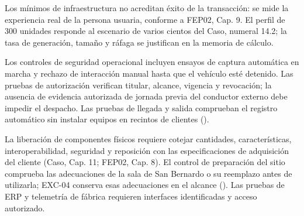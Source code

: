 Los mínimos de infraestructura no acreditan éxito de la transacción: se mide la experiencia real de la persona usuaria, conforme a FEP02, Cap. 9. El perfil de 300 unidades responde al escenario de varios cientos del Caso, numeral 14.2; la tasa de generación, tamaño y ráfaga se justifican en la memoria de cálculo.

Los controles de seguridad operacional incluyen ensayos de captura automática en marcha y rechazo de interacción manual hasta que el vehículo esté detenido. Las pruebas de autorización verifican titular, alcance, vigencia y revocación; la ausencia de evidencia autorizada de jornada previa del conductor externo debe impedir el despacho. Las pruebas de llegada y salida comprueban el registro automático sin instalar equipos en recintos de clientes ().

La liberación de componentes físicos requiere cotejar cantidades, características, interoperabilidad, seguridad y reposición con las especificaciones de adquisición del cliente (Caso, Cap. 11; FEP02, Cap. 8). El control de preparación del sitio comprueba las adecuaciones de la sala de San Bernardo o su reemplazo antes de utilizarla; EXC-04 conserva esas adecuaciones en el alcance (). Las pruebas de ERP y telemetría de fábrica requieren interfaces identificadas y acceso autorizado.
